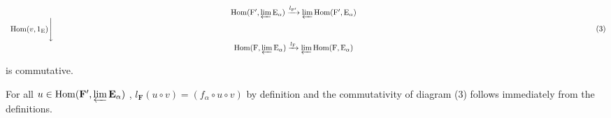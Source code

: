 \[
\begin{array}{c} \operatorname{Hom} (\mathrm{F} ^ {\prime}, \varprojlim \mathrm{E} _ {\alpha}) \xrightarrow {l _ {\mathrm{F} ^ {\prime}}} \varprojlim \operatorname{Hom} (\mathrm{F} ^ {\prime}, \mathrm{E} _ {\alpha}) \\ \operatorname{Hom} (v, 1 _ {\mathrm{E}}) \Biggl \downarrow \qquad \qquad \qquad \qquad \qquad \qquad \qquad \qquad \qquad \qquad \qquad \qquad \qquad \qquad \qquad \qquad \qquad \qquad \qquad \qquad \qquad \qquad \qquad \qquad \qquad \qquad \qquad \qquad \qquad \qquad \qquad \qquad \qquad \qquad \\ \operatorname{Hom} (\mathrm{F}, \varprojlim \mathrm{E} _ {\alpha}) \xrightarrow {l _ {\mathrm{F}}} \varprojlim \operatorname{Hom} (\mathrm{F}, \mathrm{E} _ {\alpha}) \end{array}\tag{3}
\]

is commutative.

For all \(u \in \operatorname{Hom}(\mathbf{F}', \varprojlim \mathbf{E}_{\alpha})\) , \(l_{\mathbf{F}}(u \circ v) = (f_{\alpha} \circ u \circ v)\) by definition and the commutativity of diagram (3) follows immediately from the definitions.

